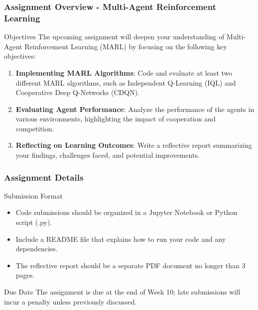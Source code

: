 \documentclass[aspectratio=169]{beamer}
\begin{document}
\begin{frame}[fragile]
    \frametitle{Assignment Overview - Multi-Agent Reinforcement Learning}
    \begin{block}{Objectives}
        The upcoming assignment will deepen your understanding of Multi-Agent Reinforcement Learning (MARL) by focusing on the following key objectives:
        \begin{enumerate}
            \item \textbf{Implementing MARL Algorithms}: Code and evaluate at least two different MARL algorithms, such as Independent Q-Learning (IQL) and Cooperative Deep Q-Networks (CDQN).
            \item \textbf{Evaluating Agent Performance}: Analyze the performance of the agents in various environments, highlighting the impact of cooperation and competition.
            \item \textbf{Reflecting on Learning Outcomes}: Write a reflective report summarizing your findings, challenges faced, and potential improvements.
        \end{enumerate}
    \end{block}
\end{frame}

\begin{frame}[fragile]
    \frametitle{Assignment Details}
    \begin{block}{Submission Format}
        \begin{itemize}
            \item Code submissions should be organized in a Jupyter Notebook or Python script (.py).
            \item Include a README file that explains how to run your code and any dependencies.
            \item The reflective report should be a separate PDF document no longer than 3 pages.
        \end{itemize}
    \end{block}
    
    \begin{block}{Due Date}
        The assignment is due at the end of Week 10; late submissions will incur a penalty unless previously discussed.
    \end{block}
\end{frame}
\end{document}
